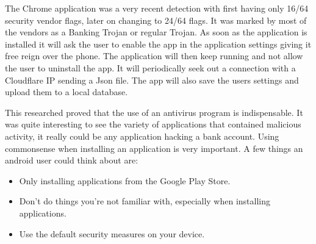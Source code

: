 The Chrome application was a very recent detection with first having only 16/64 security vendor flags, later on changing to 24/64 flags. 
It was marked by most of the vendors as a Banking Trojan or regular Trojan. 
As soon as the application is installed it will ask the user to enable the app in the application settings giving it free reign over the phone. 
The application will then keep running and not allow the user to uninstall the app. 
It will periodically seek out a connection with a Cloudflare IP sending a Json file. 
The app will also save the users settings and upload them to a local database.

This researched proved that the use of an antivirus program is indispensable.
It was quite interesting to see the variety of applications that contained malicious activity, it really could be any application hacking a bank account.
Using commonsense when installing an application is very important. A few things an android user could think about are:
\begin{itemize}
    \item Only installing applications from the Google Play Store.
    \item Don't do things you're not familiar with, especially when installing applications.
    \item Use the default security measures on your device.
\end{itemize}